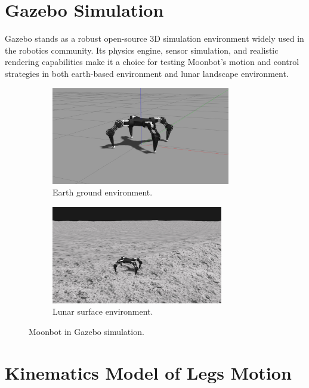 \section{Gazebo Simulation}
Gazebo \cite{gazebo} stands as a robust open-source 3D simulation environment widely used in the robotics community. Its physics engine, sensor simulation, and realistic rendering capabilities make it a choice for testing Moonbot's motion and control strategies in both earth-based environment and lunar landscape environment.

\begin{figure}[t]
 \begin{subfigure}{0.5\textwidth}
 \begin{center}
  \includegraphics[width=78mm]{./fig/chap4/simulation/moonbot_gazebo.png}
\caption{Earth ground environment.}\label{subfig_gazebo1}
\end{center}
\end{subfigure}
 \begin{subfigure}{0.5\textwidth}
 \begin{center}
  \includegraphics[width=75mm]{./fig/chap4/simulation/moonbot_gazebo5.png}
\caption{Lunar surface environment.}\label{subfig_gazebo2}
 \end{center}
 \end{subfigure}
\vspace{-2mm}
\caption{Moonbot in Gazebo simulation.}
\label{gazebosim}
\end{figure}

\section{Kinematics Model of Legs Motion}

